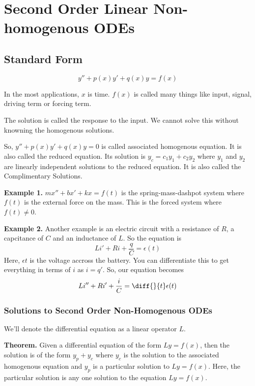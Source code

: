 

\chapter{Second Order Linear Non-homogenous ODEs}

\bigbreak

\section{Standard Form}

$$ y'' + p(x) y' + q(x) y = f(x) $$

In the most applications, $x$ is time.
$f(x)$ is called many things like input, signal, driving term or forcing term.

The solution is called the response to the input.
We cannot solve this without knowning the homogenous solutions.

So, $y'' + p(x)y' + q(x)y = 0$ is called associated homogenous equation. 
It is also called the reduced equation.
Its solution is $y_c = c_1 y_1 + c_2 y_2$ 
where $y_1$ and $y_2$ are linearly independent solutions to the reduced equation.
It is also called the Complimentary Solutions.


{\bf Example 1. } 
$mx'' + bx' + kx = f(t)$ is the spring-mass-dashpot system where $f(t)$ is the external force on the mass.
This is the forced system where $f(t) \neq 0$.

{\bf Example 2. } 
Another example is an electric circuit with a resistance of $R$,
a capcitance of $C$ and an inductance of $L$. So the equation is 
$$ Li' + Ri + \frac{q}{C} = \epsilon(t) $$
Here, $\epsilon{t}$ is the voltage accross the battery.
You can differentiate this to get everything in terms of $i$ as $i = q'$.
So, our equation becomes 
$$ Li'' + Ri' + \frac{i}{C} = \diff{}{t} \epsilon(t) $$

\subsection{Solutions to Second Order Non-Homogenous ODEs}

We'll denote the differential equation as a linear operator $L$.

\begin{mdframed}
\begin{center}
	{\bf Theorem. } Given a differential equation of the form $Ly = f(x)$, 
	then the solution is of the form $y_p + y_c$ 
	where $y_c$ is the solution to the associated homogenous equation
	and $y_p$ is a particular solution to $Ly = f(x)$.
	Here, the particular solution is any one solution to the equation $Ly = f(x)$.
\end{center}
\end{mdframed}

